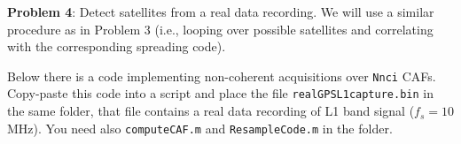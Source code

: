 \documentclass[11pt]{article}
\begin{document}
\vspace*{.5cm}

\textbf{Problem 4}:
Detect satellites from a real data recording. We will use a similar procedure as in Problem 3 (i.e., looping over possible satellites and correlating with the corresponding spreading code). 

Below there is a code implementing non-coherent acquisitions over \verb|Nnci| CAFs. Copy-paste this code into a script and place the file \verb|realGPSL1capture.bin| in the same folder, that file contains a real data recording of L1 band signal ($f_s=10$ MHz). You need also \verb|computeCAF.m| and \verb|ResampleCode.m| in the folder.

% 
% 
% 
% 
% 
% 
%     
%     
%         
\end{document}
